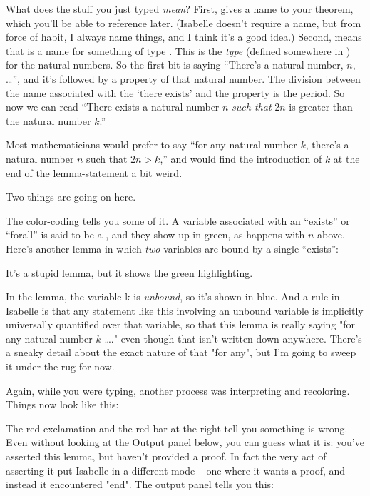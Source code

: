 What does the stuff you just typed \textit{mean}? First,  gives a name to your theorem, which you'll be able to reference later. (Isabelle doesn't require a name, but from force of habit, I always name things, and I think it's a good idea.) Second,  means that  is a name for something of type . This  is the \textit{type} (defined somewhere in ) for the natural numbers. So the first bit is saying ``There's a natural number, $n$, \ldots'', and it's followed by a property of that natural number. The division between the name associated with the `there exists' and the property is the period. So now we can read ``There exists a natural number $n$ \textit{such that} $2n$ is greater than the natural number $k$.'' 

Most mathematicians would prefer to say ``for any natural number $k$, there's a natural number $n$ such that $2n > k$,'' and would find the introduction of $k$ at the end of the lemma-statement a bit weird. 

Two things are going on here.

The color-coding tells you some of it. A variable associated with an ``exists'' or ``forall'' is said to be a , and they show up in green, as happens with $n$ above. Here's another lemma in which \textit{two} variables are bound by a single ``exists'':


It's a stupid lemma, but it shows the green highlighting. 

In the  lemma, the variable k is \textit{unbound}, so it's shown in blue. And a rule in Isabelle is that any statement like this involving an unbound variable is implicitly universally quantified over that variable, so that this lemma is really saying "for any natural number $k$ …." even though that isn't written down anywhere. There's a sneaky detail about the exact nature of that "for any", but I'm going to sweep it under the rug for now. 

Again, while you were typing, another process was interpreting and recoloring. Things now look like this:

The red exclamation and the red bar at the right tell you something is wrong. Even without looking at the Output panel below, you can guess what it is: you've asserted this lemma, but haven't provided a proof. In fact the very act of asserting it put Isabelle in a different mode -- one where it wants a proof, and instead it encountered "end". The output panel tells you this:

